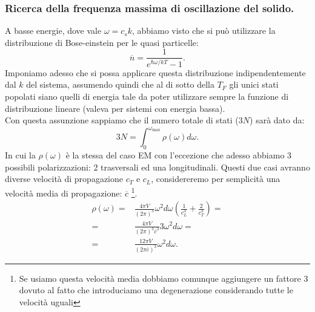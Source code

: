 \subsubsection{Ricerca della frequenza massima di oscillazione del solido.}
\label{subsubsec:Ricerca della frequenza massima di oscillazione del solido.}
A basse energie, dove vale $\omega = c_s k$, abbiamo visto che si può utilizzare la distribuzione di Bose-einstein per le quasi particelle:
\[
	\overline{n}
	=
	\frac{1}{e^{\hbar\omega /kT}-1}
.\] 
Imponiamo adesso che si possa applicare questa distribuzione indipendentemente dal $k$ del sistema, assumendo quindi che al di sotto della $T_F$ gli unici stati popolati siano quelli di energia tale da poter utilizzare sempre la funzione di distribuzione lineare (valeva per sistemi con energia bassa).\\
Con questa assunzione sappiamo che il numero totale di stati ($3N$) sarà dato da:
\[
	3N 
	=
	\int_{0}^{\omega _\text{max} }
	\rho ( \omega ) d\omega  
	\label{eq:n-stati-onde-solidi}
.\] 
In cui la $\rho ( \omega ) $ è la stessa del caso EM con l'eccezione che adesso abbiamo 3 possibili polarizzazioni: 2 trasversali ed una longitudinali. 
Questi due casi avranno diverse velocità di propagazione $c_T$ e $c_L$,  considereremo per semplicità una velocità media di propagazione: $\overline{c}$ \footnote{Se usiamo questa velocità media dobbiamo comunque aggiungere un fattore 3 dovuto al fatto che introduciamo una degenerazione considerando tutte le velocità uguali}.
\[\begin{aligned}
	 \rho ( \omega ) 
	 =&
	 \frac{4\pi V}{\left( 2\pi \right) ^3}
	 \omega^2d\omega 
	 \left( 
	 \frac{1}{c_L^3} + \frac{2}{c_T^3}	
	 \right) =\\
	 =& 
	 \frac{4\pi V}{\left( 2\pi \right) ^3\overline{c}^3}
	 3\omega^2d\omega = \\
	 =& \frac{12\pi V}{\left( 2\pi \overline{c}\right)^3}
	 \omega^2d\omega 
.\end{aligned}\]
